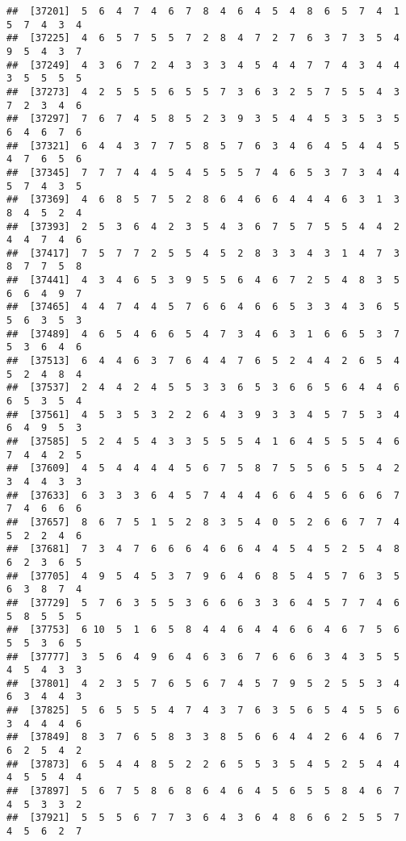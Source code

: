 \documentclass[
]{book}
\begin{document}
\begin{verbatim}
##  [37201]  5  6  4  7  4  6  7  8  4  6  4  5  4  8  6  5  7  4  1  5  7  4  3  4
##  [37225]  4  6  5  7  5  5  7  2  8  4  7  2  7  6  3  7  3  5  4  9  5  4  3  7
##  [37249]  4  3  6  7  2  4  3  3  3  4  5  4  4  7  7  4  3  4  4  3  5  5  5  5
##  [37273]  4  2  5  5  5  6  5  5  7  3  6  3  2  5  7  5  5  4  3  7  2  3  4  6
##  [37297]  7  6  7  4  5  8  5  2  3  9  3  5  4  4  5  3  5  3  5  6  4  6  7  6
##  [37321]  6  4  4  3  7  7  5  8  5  7  6  3  4  6  4  5  4  4  5  4  7  6  5  6
##  [37345]  7  7  7  4  4  5  4  5  5  5  7  4  6  5  3  7  3  4  4  5  7  4  3  5
##  [37369]  4  6  8  5  7  5  2  8  6  4  6  6  4  4  4  6  3  1  3  8  4  5  2  4
##  [37393]  2  5  3  6  4  2  3  5  4  3  6  7  5  7  5  5  4  4  2  4  4  7  4  6
##  [37417]  7  5  7  7  2  5  5  4  5  2  8  3  3  4  3  1  4  7  3  8  7  7  5  8
##  [37441]  4  3  4  6  5  3  9  5  5  6  4  6  7  2  5  4  8  3  5  6  6  4  9  7
##  [37465]  4  4  7  4  4  5  7  6  6  4  6  6  5  3  3  4  3  6  5  5  6  3  5  3
##  [37489]  4  6  5  4  6  6  5  4  7  3  4  6  3  1  6  6  5  3  7  5  3  6  4  6
##  [37513]  6  4  4  6  3  7  6  4  4  7  6  5  2  4  4  2  6  5  4  5  2  4  8  4
##  [37537]  2  4  4  2  4  5  5  3  3  6  5  3  6  6  5  6  4  4  6  6  5  3  5  4
##  [37561]  4  5  3  5  3  2  2  6  4  3  9  3  3  4  5  7  5  3  4  6  4  9  5  3
##  [37585]  5  2  4  5  4  3  3  5  5  5  4  1  6  4  5  5  5  4  6  7  4  4  2  5
##  [37609]  4  5  4  4  4  4  5  6  7  5  8  7  5  5  6  5  5  4  2  3  4  4  3  3
##  [37633]  6  3  3  3  6  4  5  7  4  4  4  6  6  4  5  6  6  6  7  7  4  6  6  6
##  [37657]  8  6  7  5  1  5  2  8  3  5  4  0  5  2  6  6  7  7  4  5  2  2  4  6
##  [37681]  7  3  4  7  6  6  6  4  6  6  4  4  5  4  5  2  5  4  8  6  2  3  6  5
##  [37705]  4  9  5  4  5  3  7  9  6  4  6  8  5  4  5  7  6  3  5  6  3  8  7  4
##  [37729]  5  7  6  3  5  5  3  6  6  6  3  3  6  4  5  7  7  4  6  5  8  5  5  5
##  [37753]  6 10  5  1  6  5  8  4  4  6  4  4  6  6  4  6  7  5  6  5  5  3  6  5
##  [37777]  3  5  6  4  9  6  4  6  3  6  7  6  6  6  3  4  3  5  5  4  5  4  3  3
##  [37801]  4  2  3  5  7  6  5  6  7  4  5  7  9  5  2  5  5  3  4  6  3  4  4  3
##  [37825]  5  6  5  5  5  4  7  4  3  7  6  3  5  6  5  4  5  5  6  3  4  4  4  6
##  [37849]  8  3  7  6  5  8  3  3  8  5  6  6  4  4  2  6  4  6  7  6  2  5  4  2
##  [37873]  6  5  4  4  8  5  2  2  6  5  5  3  5  4  5  2  5  4  4  4  5  5  4  4
##  [37897]  5  6  7  5  8  6  8  6  4  6  4  5  6  5  5  8  4  6  7  4  5  3  3  2
##  [37921]  5  5  5  6  7  7  3  6  4  3  6  4  8  6  6  2  5  5  7  4  5  6  2  7

\end{verbatim}
\end{document}
